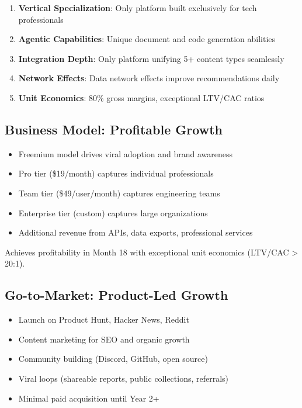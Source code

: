 \documentclass{report}
\begin{document}
\begin{enumerate}
    \item \textbf{Vertical Specialization}: Only platform built exclusively for tech professionals
    \item \textbf{Agentic Capabilities}: Unique document and code generation abilities
    \item \textbf{Integration Depth}: Only platform unifying 5+ content types seamlessly
    \item \textbf{Network Effects}: Data network effects improve recommendations daily
    \item \textbf{Unit Economics}: 80\% gross margins, exceptional LTV/CAC ratios
\end{enumerate}

\subsection{Business Model: Profitable Growth}

\begin{itemize}
    \item Freemium model drives viral adoption and brand awareness
    \item Pro tier (\$19/month) captures individual professionals
    \item Team tier (\$49/user/month) captures engineering teams
    \item Enterprise tier (custom) captures large organizations
    \item Additional revenue from APIs, data exports, professional services
\end{itemize}

Achieves profitability in Month 18 with exceptional unit economics (LTV/CAC > 20:1).

\subsection{Go-to-Market: Product-Led Growth}

\begin{itemize}
    \item Launch on Product Hunt, Hacker News, Reddit
    \item Content marketing for SEO and organic growth
    \item Community building (Discord, GitHub, open source)
    \item Viral loops (shareable reports, public collections, referrals)
    \item Minimal paid acquisition until Year 2+
\end{itemize}
\end{document}
